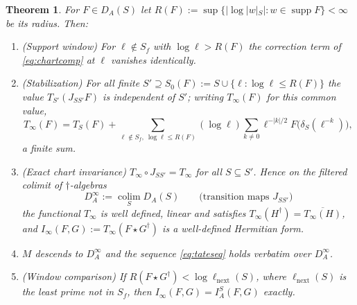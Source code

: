 \documentclass[11pt]{amsart}
\newtheorem{theorem}{Theorem}[section]
\theoremstyle{definition}
\theoremstyle{remark}
\newcommand{\supp}{\operatorname{supp}}
\newcommand{\DA}{D_A}
\begin{document}
\begin{theorem}\label{thm:colimtrace}
For $F\in\DA(S)$ let $R(F):=\sup\{|\log|w|_S|:w\in\supp F\}<\infty$ be its
\emph{radius}.  Then:
\begin{enumerate}
\item[(a)] \emph{(Support window)}  For $\ell\notin S_f$ with $\log\ell>R(F)$
the correction term of \eqref{eq:chartcomp} at $\ell$ vanishes identically.
\item[(b)] \emph{(Stabilization)}  For all finite $S'\supseteq
S_0(F):=S\cup\{\ell:\log\ell\le R(F)\}$ the value $T_{S'}(J_{SS'}F)$ is independent
of $S'$; writing $T_{\infty}(F)$ for this common value,
\begin{equation}\label{eq:Tinf}
T_{\infty}(F)=T_S(F)+\sum_{\ell\notin S_f,\ \log\ell\le R(F)}(\log\ell)
\sum_{k\ne0}\ell^{-|k|/2}F\bigl(\delta_S(\ell^{-k})\bigr),
\end{equation}
a finite sum.
\item[(c)] \emph{(Exact chart invariance)}  $T_{\infty}\circ J_{SS'}=T_{\infty}$
for all $S\subseteq S'$.  Hence on the filtered colimit of $\dagger$-algebras
\begin{equation}\label{eq:colim}
\DA^{\infty}:=\operatorname*{colim}_{S}\DA(S)\qquad
\text{(transition maps }J_{SS'})
\end{equation}
the functional $T_{\infty}$ is well defined, linear and satisfies
$T_{\infty}(H^{\dagger})=\overline{T_{\infty}(H)}$, and
$I_{\infty}(F,G):=T_{\infty}(F\star G^{\dagger})$ is a well-defined Hermitian
form.
\item[(d)] $M$ descends to $\DA^{\infty}$ and the sequence
\eqref{eq:tateseq} holds verbatim over $\DA^{\infty}$.
\item[(e)] \emph{(Window comparison)}  If $R(F\star G^{\dagger})<
\log\ell_{\mathrm{next}}(S)$, where $\ell_{\mathrm{next}}(S)$ is the least
prime not in $S_f$, then $I_{\infty}(F,G)=I_A^{S}(F,G)$ exactly.
\end{enumerate}
\end{theorem}
\end{document}
